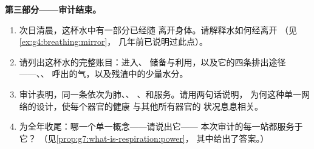 \begin{problem}
\medskip\noindent\textbf{第三部分——审计结束。}
\begin{enumerate}[resume]
  \item 次日清晨，这杯水中有一部分已经随
        离开身体。请解释水如何经离开
        （见\cref{ex:g4:breathing:mirror}，
        几年前已说明过此点）。
  \item 请列出这杯水的完整账目：进入、
        储备与利用，以及它的四条排出途径——、、
        呼出的气，以及残渣中的少量水分。
  \item 审计表明，同一条依次为肺、、
        、和服务。请用两句话说明，
        为何这种单一网络的设计，使每个器官的健康
        与其他所有器官的
        状况息息相关。
  \item 为全年收尾：哪一个单一概念——请说出它——
        本次审计的每一站都服务于它？
        （见\cref{prop:g7:what-is-respiration:power}，
        其中给出了答案。）
\end{enumerate}
\end{problem}
